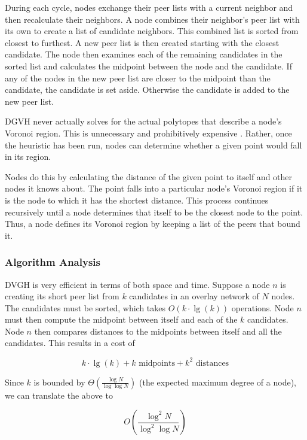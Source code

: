 During each cycle, nodes exchange their peer lists with a current neighbor and then recalculate their neighbors.  
A node combines their neighbor's peer list with its own to create a list of candidate neighbors.
This combined list is sorted from closest to furthest.
A new peer list is then created starting with the closest candidate.
The node then examines each of the remaining candidates in the sorted list and calculates the midpoint between the node and the candidate.
If any of the nodes in the new peer list are closer to the midpoint than the candidate, the candidate is set aside.  
Otherwise the candidate is added to the new peer list.


DGVH never actually solves for the actual polytopes that describe a node's Voronoi region.
This is unnecessary and prohibitively expensive \cite{raynet}.
Rather, once the heuristic has been run, nodes can determine whether a given point would fall in its region.

Nodes do this by calculating the distance of the given point to itself and other nodes it knows about.
The point falls into a particular node's Voronoi region if it is the node to which it has the shortest distance.
This process continues recursively until a node determines that itself to be the closest node to the point.
Thus, a node defines its Voronoi region by keeping a list of the peers that bound it.



\subsubsection{Algorithm Analysis}

DVGH is very efficient in terms of both space and time.
Suppose a node $n$ is creating its short peer list from $k$ candidates in an overlay network of $N$ nodes. 
The candidates must be sorted, which takes $O(k\cdot\lg(k))$ operations.  
Node $n$ must then compute the midpoint between itself and each of the $k$ candidates.  
Node $n$ then compares distances to the midpoints between itself and all the candidates.  
This results in a cost of 

\[ k\cdot\lg(k) + k \text{ midpoints}  + k^{2} \text{ distances} \]


Since $k$ is  bounded by $\Theta(\frac{\log N}{\log \log N} )$ \cite{bern1991expected} (the expected maximum degree of a node), we can translate the above to

\[O(\frac{\log^{2} N}{\log^{2} \log N} )\]

